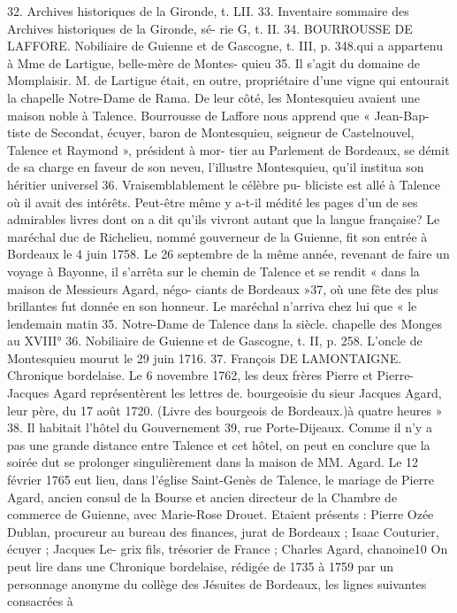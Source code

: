 \documentclass[a4paper,11pt]{book}
\begin{document}
32. Archives historiques de la Gironde, t. LII.
33. Inventaire sommaire des Archives historiques de la Gironde, sé-
rie G, t. II.
34. BOURROUSSE DE LAFFORE. Nobiliaire de Guienne et de Gascogne,
t. III, p. 348.qui a appartenu à Mme de Lartigue, belle-mère de Montes-
quieu 35.
Il s'agit du domaine de Momplaisir. M. de Lartigue était,
en outre, propriétaire d'une vigne qui entourait la chapelle
Notre-Dame de Rama.
De leur côté, les Montesquieu avaient une maison noble
à Talence.
Bourrousse de Laffore nous apprend que « Jean-Bap-
tiste de Secondat, écuyer, baron de Montesquieu, seigneur
de Castelnouvel, Talence et Raymond », président à mor-
tier au Parlement de Bordeaux, se démit de sa charge en
faveur de son neveu, l'illustre Montesquieu, qu'il institua
son héritier universel 36. Vraisemblablement le célèbre pu-
bliciste est allé à Talence où il avait des intérêts. Peut-être
même y a-t-il médité les pages d'un de ses admirables livres
dont on a dit qu'ils vivront autant que la langue française?
Le maréchal duc de Richelieu, nommé gouverneur de
la Guienne, fit son entrée à Bordeaux le 4 juin 1758. Le
26 septembre de la même année, revenant de faire un
voyage à Bayonne, il s'arrêta sur le chemin de Talence
et se rendit « dans la maison de Messieurs Agard, négo-
ciants de Bordeaux »37, où une fête des plus brillantes
fut donnée en son honneur.
Le maréchal n'arriva chez lui que « le lendemain matin
35. Notre-Dame de Talence dans la
siècle.
chapelle des Monges au XVIII°
36. Nobiliaire de Guienne et de Gascogne, t. II, p. 258.
L'oncle de Montesquieu mourut le 29 juin 1716.
37. François DE LAMONTAIGNE. Chronique bordelaise.
Le 6 novembre 1762, les deux frères Pierre et Pierre-Jacques Agard
représentèrent les lettres de. bourgeoisie du sieur Jacques Agard, leur
père, du 17 août 1720. (Livre des bourgeois de Bordeaux.)à quatre heures » 38. Il habitait l'hôtel du Gouvernement 39,
rue Porte-Dijeaux. Comme il n'y a pas une grande distance
entre Talence et cet hôtel, on peut en conclure que la
soirée dut se prolonger singulièrement dans la maison de
MM. Agard.
Le 12 février 1765 eut lieu, dans l'église Saint-Genès de
Talence, le mariage de Pierre Agard, ancien consul de
la Bourse et ancien directeur de la Chambre de commerce
de Guienne, avec Marie-Rose Drouet. Etaient présents :
Pierre Ozée Dublan, procureur au bureau des finances,
jurat de Bordeaux ; Isaac Couturier, écuyer ; Jacques Le-
grix fils, trésorier de France ; Charles Agard, chanoine10
On peut lire dans une Chronique bordelaise, rédigée de
1735 à 1759 par un personnage anonyme du collège des
Jésuites de Bordeaux, les lignes suivantes consacrées à
\end{document}
